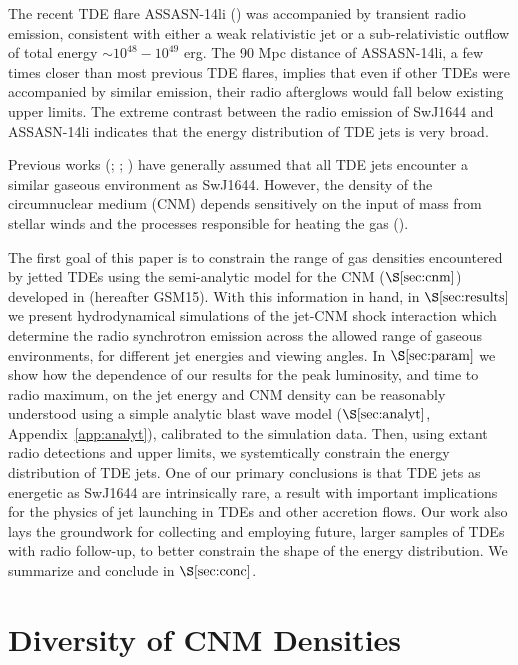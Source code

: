 \documentclass[usenatbib,fleqn]{mnras}
\begin{document}
The recent TDE flare ASSASN-14li (\citealt{Holoien+2016a}) was
accompanied by transient radio emission, consistent with either a weak
relativistic jet \citep{van-Velzen+2015} or a sub-relativistic outflow
\citep{Alexander+2015,Krolik+16} of total energy $\sim
10^{48}-10^{49}$ erg.  The 90 Mpc distance of ASSASN-14li, a few
times closer than most previous TDE flares, implies that even if other
TDEs were accompanied by similar emission, their radio afterglows
would fall below existing upper limits.  The extreme contrast between
the radio emission of SwJ1644 and ASSASN-14li indicates that the
energy distribution of TDE jets is very broad.

Previous works (\citealt{Bower+2013}; \citealt{van-Velzen+2013};
\citealt{Mimica+2015}) have generally assumed that all TDE jets
encounter a similar gaseous environment as SwJ1644.  However, the
density of the circumnuclear medium (CNM) depends sensitively on the
input of mass from stellar winds and the processes responsible for
heating the gas (\citealt{Quataert2004,Generozov+2015}). 

The first goal of this paper is to constrain the range of gas
densities encountered by jetted TDEs using the semi-analytic model for
the CNM ($\S\ref{sec:cnm}$) developed in \citet{Generozov+2015}
(hereafter GSM15).  With this information in hand, in
$\S\ref{sec:results}$ we present hydrodynamical simulations of the
jet-CNM shock interaction which determine the radio synchrotron
emission across the allowed range of gaseous environments, for
different jet energies and viewing angles.  In $\S\ref{sec:param}$ we
show how the dependence of our results for the peak luminosity, and
time to radio maximum, on the jet energy and CNM density can be
reasonably understood using a simple analytic blast wave model
($\S\ref{sec:analyt}$, Appendix~\ref{app:analyt}), calibrated to the
simulation data.  Then, using extant radio detections and upper
limits, we systemtically constrain the energy distribution of TDE
jets.  One of our primary conclusions is that TDE jets as energetic as
SwJ1644 are intrinsically rare, a result with important implications
for the physics of jet launching in TDEs and other accretion flows.
Our work also lays the groundwork for collecting and employing future,
larger samples of TDEs with radio follow-up, to better constrain the
shape of the energy distribution.  We summarize and conclude in
$\S\ref{sec:conc}$.

\section{Diversity of CNM Densities}
\label{sec:cnm}
\end{document}

